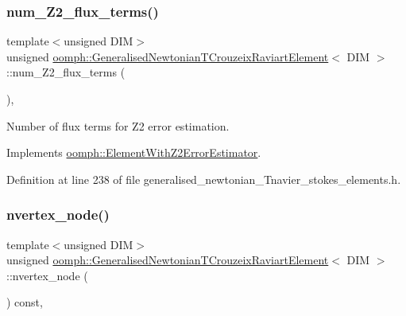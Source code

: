 \subsubsection{\texorpdfstring{num\+\_\+\+Z2\+\_\+flux\+\_\+terms()}{num\_Z2\_flux\_terms()}}
{\footnotesize\ttfamily template$<$unsigned D\+IM$>$ \\
unsigned \hyperlink{classoomph_1_1GeneralisedNewtonianTCrouzeixRaviartElement}{oomph\+::\+Generalised\+Newtonian\+T\+Crouzeix\+Raviart\+Element}$<$ D\+IM $>$\+::num\+\_\+\+Z2\+\_\+flux\+\_\+terms (\begin{DoxyParamCaption}{ }\end{DoxyParamCaption})\hspace{0.3cm}{\ttfamily [inline]}, {\ttfamily [virtual]}}



Number of \textquotesingle{}flux\textquotesingle{} terms for Z2 error estimation. 



Implements \hyperlink{classoomph_1_1ElementWithZ2ErrorEstimator_ae82c5728902e13da31be19c390fc28e3}{oomph\+::\+Element\+With\+Z2\+Error\+Estimator}.



Definition at line 238 of file generalised\+\_\+newtonian\+\_\+\+Tnavier\+\_\+stokes\+\_\+elements.\+h.

\mbox{\label{classoomph_1_1GeneralisedNewtonianTCrouzeixRaviartElement_a6eabb8253427c2b4b5ed8f466b009ffc}} 
\subsubsection{\texorpdfstring{nvertex\+\_\+node()}{nvertex\_node()}}
{\footnotesize\ttfamily template$<$unsigned D\+IM$>$ \\
unsigned \hyperlink{classoomph_1_1GeneralisedNewtonianTCrouzeixRaviartElement}{oomph\+::\+Generalised\+Newtonian\+T\+Crouzeix\+Raviart\+Element}$<$ D\+IM $>$\+::nvertex\+\_\+node (\begin{DoxyParamCaption}{ }\end{DoxyParamCaption}) const\hspace{0.3cm}{\ttfamily [inline]}, {\ttfamily [virtual]}}



